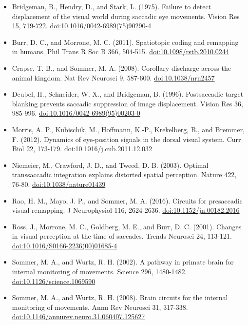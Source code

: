 \documentclass[11pt,a4paper]{article}
\begin{document}
\begin{itemize}[itemsep=2pt,topsep=2pt]
\item Bridgeman, B., Hendry, D., and Stark, L. (1975). Failure to detect displacement of the visual world during saccadic eye movements. Vision Res 15, 719-722. \href{https://doi.org/10.1016/0042-6989(75)90290-4}{doi:10.1016/0042-6989(75)90290-4}
\item Burr, D. C., and Morrone, M. C. (2011). Spatiotopic coding and remapping in humans. Phil Trans R Soc B 366, 504-515. \href{https://doi.org/10.1098/rstb.2010.0244}{doi:10.1098/rstb.2010.0244}
\item Crapse, T. B., and Sommer, M. A. (2008). Corollary discharge across the animal kingdom. Nat Rev Neurosci 9, 587-600. \href{https://doi.org/10.1038/nrn2457}{doi:10.1038/nrn2457}
\item Deubel, H., Schneider, W. X., and Bridgeman, B. (1996). Postsaccadic target blanking prevents saccadic suppression of image displacement. Vision Res 36, 985-996. \href{https://doi.org/10.1016/0042-6989(95)00203-0}{doi:10.1016/0042-6989(95)00203-0}
\item Morris, A. P., Kubischik, M., Hoffmann, K.-P., Krekelberg, B., and Bremmer, F. (2012). Dynamics of eye-position signals in the dorsal visual system. Curr Biol 22, 173-179. \href{https://doi.org/10.1016/j.cub.2011.12.032}{doi:10.1016/j.cub.2011.12.032}
\item Niemeier, M., Crawford, J. D., and Tweed, D. B. (2003). Optimal transsaccadic integration explains distorted spatial perception. Nature 422, 76-80. \href{https://doi.org/10.1038/nature01439}{doi:10.1038/nature01439}
\item Rao, H. M., Mayo, J. P., and Sommer, M. A. (2016). Circuits for presaccadic visual remapping. J Neurophysiol 116, 2624-2636. \href{https://doi.org/10.1152/jn.00182.2016}{doi:10.1152/jn.00182.2016}
\item Ross, J., Morrone, M. C., Goldberg, M. E., and Burr, D. C. (2001). Changes in visual perception at the time of saccades. Trends Neurosci 24, 113-121. \href{https://doi.org/10.1016/S0166-2236(00)01685-4}{doi:10.1016/S0166-2236(00)01685-4}
\item Sommer, M. A., and Wurtz, R. H. (2002). A pathway in primate brain for internal monitoring of movements. Science 296, 1480-1482. \href{https://doi.org/10.1126/science.1069590}{doi:10.1126/science.1069590}
\item Sommer, M. A., and Wurtz, R. H. (2008). Brain circuits for the internal monitoring of movements. Annu Rev Neurosci 31, 317-338. \href{https://doi.org/10.1146/annurev.neuro.31.060407.125627}{doi:10.1146/annurev.neuro.31.060407.125627}

\end{itemize}
\end{document}
